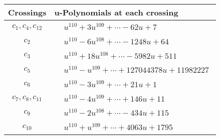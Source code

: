 \documentclass[1p]{elsarticle_modified}
\theoremstyle{definition}
\begin{document}
\begin{tabular}{m{50pt}|m{274pt}}
Crossings & \hspace{64pt}u-Polynomials at each crossing \\
\hline $$\begin{aligned}c_{1},c_{4},c_{12}\end{aligned}$$&$\begin{aligned}
&u^{110}+3 u^{109}+\cdots-62 u+7
\end{aligned}$\\
\hline $$\begin{aligned}c_{2}\end{aligned}$$&$\begin{aligned}
&u^{110}-6 u^{108}+\cdots-1248 u+64
\end{aligned}$\\
\hline $$\begin{aligned}c_{3}\end{aligned}$$&$\begin{aligned}
&u^{110}+18 u^{108}+\cdots-5982 u+511
\end{aligned}$\\
\hline $$\begin{aligned}c_{5}\end{aligned}$$&$\begin{aligned}
&u^{110}- u^{109}+\cdots+127044378 u+11982227
\end{aligned}$\\
\hline $$\begin{aligned}c_{6}\end{aligned}$$&$\begin{aligned}
&u^{110}-3 u^{109}+\cdots+21 u+1
\end{aligned}$\\
\hline $$\begin{aligned}c_{7},c_{8},c_{11}\end{aligned}$$&$\begin{aligned}
&u^{110}-4 u^{109}+\cdots+146 u+11
\end{aligned}$\\
\hline $$\begin{aligned}c_{9}\end{aligned}$$&$\begin{aligned}
&u^{110}-2 u^{108}+\cdots-434 u+115
\end{aligned}$\\
\hline $$\begin{aligned}c_{10}\end{aligned}$$&$\begin{aligned}
&u^{110}+u^{109}+\cdots+4063 u+1795
\end{aligned}$\\
\hline
\end{tabular}\\~\\
\end{document}
